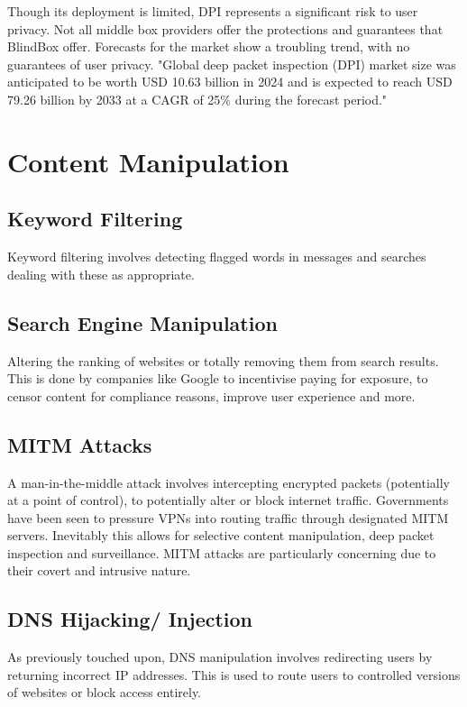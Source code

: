 Though its deployment is limited, DPI represents a significant risk to user privacy. Not all middle box providers offer the protections and guarantees that BlindBox offer. Forecasts for the market show a troubling trend, with no guarantees of user privacy. "Global deep packet inspection (DPI) market size was anticipated to be worth USD 10.63 billion in 2024 and is expected to reach USD 79.26 billion by 2033 at a CAGR of 25\% during the forecast period." \cite{DPIMarketInfo}








\section{Content Manipulation}
\subsection{Keyword Filtering}
Keyword filtering involves detecting flagged words in messages and searches dealing with these as appropriate.  
 
\subsection{Search Engine Manipulation}
Altering the ranking of websites or totally removing them from search results. This is done by companies like Google to incentivise paying for exposure, to censor content for compliance reasons, improve user experience and more. 

\subsection{MITM Attacks}
A man-in-the-middle attack involves intercepting encrypted packets (potentially at a point of control), to potentially alter or block internet traffic. Governments have been seen to pressure VPNs into routing traffic through designated MITM servers. Inevitably this allows for selective content manipulation, deep packet inspection and surveillance. MITM attacks are particularly concerning due to their covert and intrusive nature. 
 
\subsection{DNS Hijacking/ Injection}
As previously touched upon, DNS manipulation involves redirecting users by returning incorrect IP addresses. This is used to route users to controlled versions of websites or block access entirely. 

